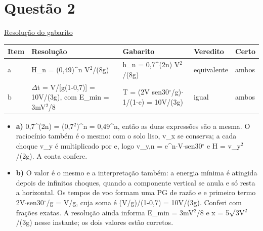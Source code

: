 \documentclass{article}%
\begin{document}
\section*{Questão 2}%
\href{https://poliedroresolve.sistemapoliedro.com.br/vestibulares/ita/2027/ita-2-fase-dia-3-22-10-2026-2-fase-dia-3/dissertativa-2-fisica-2-fase-dia-3-ita-2027}{Resolução do gabarito}\par\smallskip%
\begin{longtable}{@{}p{} p{} p{} p{} p{}@{}}\toprule Item & Resolução & Gabarito & Veredito & Certo \\ \midrule
a & H\_n = (0,49)\^{}n V$^2$/(8g) & h\_n = 0,7\^{}(2n) V$^2$/(8g) & equivalente & ambos \\
b & $\Delta$t = V/{[}g(1-0,7){]} = 10V/(3g), com E\_min = 3mV$^2$/8 & T = (2V sen30$^\circ$/g)$\cdot$1/(1-e) = 10V/(3g) & igual & ambos \\
\bottomrule\end{longtable}%
\begin{itemize}%
\item%
\textbf{a)} 0,7\^{}(2n) = (0,7$^2$)\^{}n = 0,49\^{}n, então as duas expressões são a mesma. O raciocínio também é o mesmo: com o solo liso, v\_x se conserva; a cada choque v\_y é multiplicado por e, logo v\_y,n = e\^{}n$\cdot$V$\cdot$sen30$^\circ$ e H = v\_y$^2$/(2g). A conta confere.%
\item%
\textbf{b)} O valor é o mesmo e a interpretação também: a energia mínima é atingida depois de infinitos choques, quando a componente vertical se anula e só resta a horizontal. Os tempos de voo formam uma PG de razão e e primeiro termo 2V$\cdot$sen30$^\circ$/g = V/g, cuja soma é (V/g)/(1-0,7) = 10V/(3g). Conferi com frações exatas. A resolução ainda informa E\_min = 3mV$^2$/8 e x = 5$\surd$3V$^2$/(3g) nesse instante; os dois valores estão corretos.%
\end{itemize}%
\end{document}
